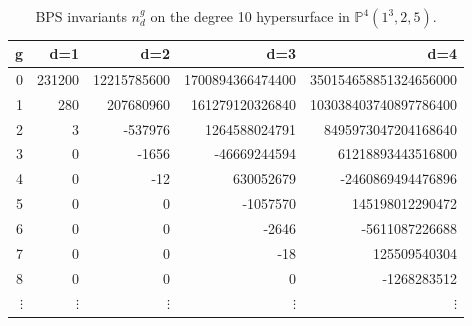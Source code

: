 \documentclass[12pt]{article}
\begin{document}
\begin{table}
\begin{centering}
\begin{tabular}{|r|rrrr|}
\hline
g &d=1 &d=2 &d=3 &d=4  \\
\hline
0& 231200& 12215785600& 1700894366474400& 350154658851324656000
\\
1&    280&   207680960&  161279120326840& 103038403740897786400
\\
2&      3&    -537976 &    1264588024791&   8495973047204168640
\\
3&      0&       -1656&     -46669244594&     61218893443516800
\\
4& 0     &         -12&        630052679&     -2460869494476896
\\
5& 0     &           0&         -1057570&       145198012290472
\\
6& 0     &           0&            -2646&        -5611087226688
\\
7& 0     &           0&              -18&         125509540304
\\
8& 0     &           0&                0&         -1268283512
\\
$\vdots$&$\vdots$&$\vdots$&$\vdots$&$\vdots$ \\
\hline
\end{tabular}
\caption{BPS invariants $n^g_d$ on the degree 10  hypersurface in $\mathbb{P}^4(1^3,2,5)$.}
\end{centering}
\end{table}
\end{document}
